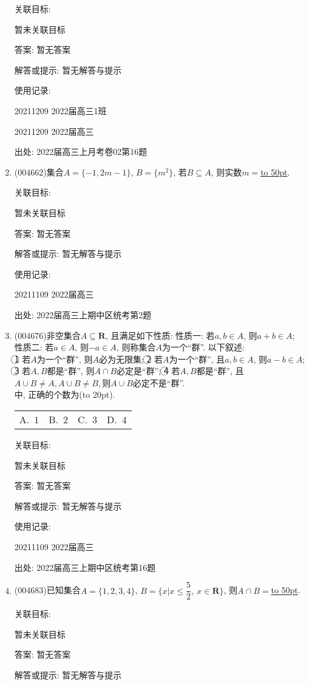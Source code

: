 \documentclass[10pt,a4paper]{article}
\newcommand{\blank}[1]{\underline{\hbox to #1pt{}}}
\newcommand{\bracket}[1]{(\hbox to #1pt{})}
\newcommand{\fourch}[4]{\par\begin{tabular}{p{.23\textwidth}p{.23\textwidth}p{.23\textwidth}p{.23\textwidth}}
A.~#1 &B.~#2& C.~#3& D.~#4
\end{tabular}}
\begin{document}
\begin{enumerate}[1.]
关联目标:

暂未关联目标

答案: 暂无答案

解答或提示: 暂无解答与提示

使用记录:

20211209	2022届高三1班	

20211209	2022届高三	


出处: 2022届高三上月考卷02第16题
\item { (004662)}集合$A=\{-1, 2m-1\}$, $B=\{m^2\}$, 若$B\subseteq A$, 则实数$m=$\blank{50}.


关联目标:

暂未关联目标

答案: 暂无答案

解答或提示: 暂无解答与提示

使用记录:

20211109	2022届高三	


出处: 2022届高三上期中区统考第2题
\item { (004676)}非空集合$A\subseteq \mathbf{R}$, 且满足如下性质:
性质一: 若$a,b\in A$, 则$a+b\in A$;
性质二: 若$a\in A$, 则$-a\in A$, 则称集合$A$为一个``群''. 以下叙述:\\
\textcircled{1} 若$A$为一个``群'', 则$A$必为无限集;
\textcircled{2} 若$A$为一个``群'', 且$a,b\in A$, 则$a-b\in A$;
\textcircled{3} 若$A,B$都是``群'', 则$A\cap B$必定是``群'';
\textcircled{4} 若$A,B$都是``群'', 且$A\cup B\ne A,A\cup B\ne B,$则$A\cup B$必定不是``群''.\\
中, 正确的个数为\bracket{20}.
\fourch{$1$}{$2$}{$3$}{$4$}


关联目标:

暂未关联目标

答案: 暂无答案

解答或提示: 暂无解答与提示

使用记录:

20211109	2022届高三	


出处: 2022届高三上期中区统考第16题
\item { (004683)}已知集合$A=\{1,2,3,4\}$, $B=\{x|x\le \dfrac 52, \ x\in \mathbf{R}\}$, 则$A\cap B=$\blank{50}.


关联目标:

暂未关联目标

答案: 暂无答案

解答或提示: 暂无解答与提示


\end{enumerate}
\end{document}
